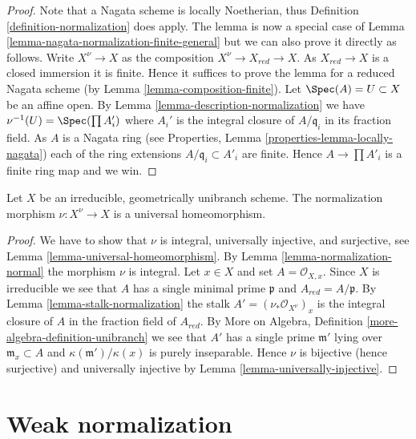 \begin{proof}
Note that a Nagata scheme is locally Noetherian, thus
Definition \ref{definition-normalization}
does apply. The lemma is now a special case of
Lemma \ref{lemma-nagata-normalization-finite-general}
but we can also prove it directly as follows.
Write $X^\nu \to X$ as the composition
$X^\nu \to X_{red} \to X$. As $X_{red} \to X$ is a closed immersion
it is finite. Hence it suffices to prove the lemma for a reduced
Nagata scheme (by Lemma \ref{lemma-composition-finite}).
Let $\Spec(A) = U \subset X$ be an affine open.
By Lemma \ref{lemma-description-normalization} we have
$\nu^{-1}(U) = \Spec(\prod A_i')$ where $A_i'$ is the integral
closure of $A/\mathfrak q_i$ in its fraction field. As $A$ is a Nagata
ring (see Properties, Lemma \ref{properties-lemma-locally-nagata})
each of the ring extensions
$A/\mathfrak q_i \subset A'_i$ are finite. Hence $A \to \prod A'_i$
is a finite ring map and we win.
\end{proof}

\begin{lemma}
\label{lemma-normalization-geom-unibranch-univ-homeo}
Let $X$ be an irreducible, geometrically unibranch scheme.
The normalization morphism $\nu : X^\nu \to X$ is a universal
homeomorphism.
\end{lemma}

\begin{proof}
We have to show that $\nu$ is integral, universally injective,
and surjective, see Lemma \ref{lemma-universal-homeomorphism}.
By Lemma \ref{lemma-normalization-normal} the morphism $\nu$
is integral. Let $x \in X$ and set $A = \mathcal{O}_{X, x}$.
Since $X$ is irreducible we see that $A$ has a single
minimal prime $\mathfrak p$ and $A_{red} = A/\mathfrak p$.
By Lemma \ref{lemma-stalk-normalization} the stalk
$A' = (\nu_*\mathcal{O}_{X^\nu})_x$ is the integral closure of
$A$ in the fraction field of $A_{red}$. By
More on Algebra, Definition \ref{more-algebra-definition-unibranch}
we see that $A'$ has a single prime $\mathfrak m'$ lying
over $\mathfrak m_x \subset A$ and $\kappa(\mathfrak m')/\kappa(x)$
is purely inseparable. Hence $\nu$ is bijective (hence surjective)
and universally injective by Lemma \ref{lemma-universally-injective}.
\end{proof}







\section{Weak normalization}
\label{section-weak-normalization}

